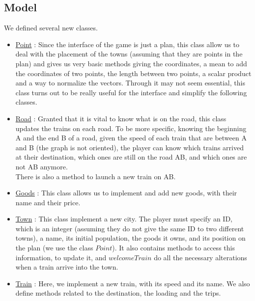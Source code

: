 \documentclass[a4paper]{article}
\begin{document}
	\subsection{Model}
	We defined several new classes.
	\begin{itemize}
		\item \underline{Point} : Since the interface of the game is just a plan, this class allow us to deal with the placement of the towns (assuming that they are points in the plan) and gives us very basic methods giving the coordinates, a mean to add the coordinates of two points, the length between two points, a scalar product and a way to normalize the vectors. Through it may not seem essential, this class turns out to be really useful for the interface and simplify the following classes.
		
		\item \underline{Road} : Granted that it is vital to know what is on the road, this class updates the trains on each road. To be more specific, knowing the beginning A and the end B of a road, given the speed of each train that are between A and B (the graph is not oriented), the player can know which trains arrived at their destination, which ones are still on the road AB, and which ones are not AB anymore.\\
		There is also a method to launch a new train on AB.
		
		\item \underline{Goods} : This class allows us to implement and add new goods, with their name and their price.
		
		\item \underline{Town} : This class implement a new city. The player must specify an ID, which is an integer (assuming they do not give the same ID to two different towns), a name, its initial population, the goods it owns, and its position on the plan (we use the class $Point$). It also contains methods to access this information, to update it, and $welcomeTrain$ do all the necessary alterations when a train arrive into the town.
		
		\item \underline{Train} : Here, we implement a new train, with its speed and its name. We also define methods related to the destination, the loading and the trips.
		

\end{itemize}
\end{document}

